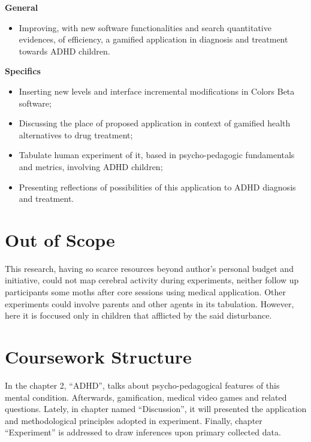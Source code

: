 \textbf{General}
\label{sc:objetivosGerais}
\begin{itemize}
\item Improving, with new software functionalities and search quantitative evidences, of efficiency, a gamified application in diagnosis and treatment towards ADHD children. 
\end{itemize}

\textbf{Specifics}
\label{sc:objetivosEspecificos}
\begin{itemize}
\item Inserting new levels and interface incremental modifications in Colors Beta software;
\item Discussing the place of proposed application in context of gamified health alternatives to drug treatment;
\item Tabulate human experiment of it, based in psycho-pedagogic fundamentals and metrics, involving ADHD children;
\item Presenting reflections of possibilities of this application to ADHD diagnosis and treatment.


\end{itemize}

\section{Out of Scope}
\label{sc:outofscope}
This research, having so scarce resources beyond author's personal budget and initiative, could not map cerebral activity during experiments, neither follow up participants some moths after core sessions using medical application. Other experiments could involve parents and other agents in its tabulation. However, here it is foccused only in children that afflicted by the said disturbance.


\section{Coursework Structure}
\label{sc:structure}

In the chapter 2, ``ADHD'', talks about psycho-pedagogical features of this mental condition. Afterwards, gamification, medical video games and related questions. Lately, in chapter named ``Discussion'', it will presented the application  and methodological principles adopted in experiment. Finally, chapter ``Experiment'' is addressed to draw inferences upon primary collected data.
